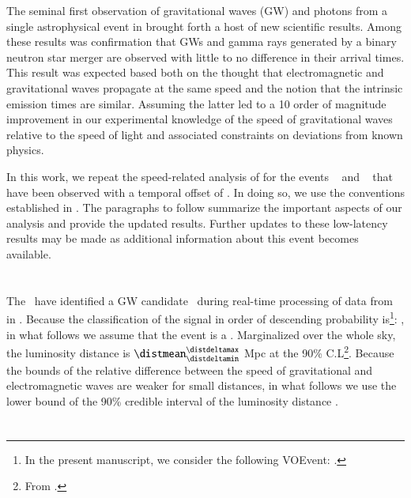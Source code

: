 \documentclass[aps,twocolumn,nofootinbib,nopreprintnumbers,showpacs,linenumbers,floatfix,longbibliography,superscriptaddress,prd]{revtex4-1}
\begin{document}
The seminal first observation of gravitational waves (GW) and photons from a single astrophysical event in \cite{abbott:2017bnsgrb} brought forth a host of new scientific results. Among these results was confirmation that GWs and gamma rays generated by a binary neutron star merger
are observed with little to no difference in their arrival times.
This result was expected based both on
the thought that electromagnetic and gravitational waves propagate at the same speed
and the notion that the intrinsic emission times are similar.
Assuming the latter led to a 10 order of magnitude improvement in our experimental knowledge 
of the speed of gravitational waves relative to the speed of light
and associated constraints on deviations from known physics. \cite{abbott:2017bnsgrb}

In this work,
we repeat the speed-related analysis of \citet{abbott:2017bnsgrb} for the events 
\GWevent~ and \GRBevent~ that have been observed with a temporal offset of \tdelay.
In doing so,
we use the conventions established in \cite{abbott:2017bnsgrb}.
The paragraphs to follow
summarize the important aspects of our analysis
and provide the updated results.
Further updates to these low-latency results may be made
as additional information about this event becomes available.

\section{\GWevent}


The \GWcolla~have identified a GW candidate \GWevent~during real-time processing of data from \pipesup~ in \detectors. Because the classification of the signal in order of descending probability is\footnote{In the present manuscript, we consider the following VOEvent: \href{\urlVOEvent}{\urlVOEvent}.}: \Pevents, in what follows we assume that the event is a \ety. Marginalized over the whole sky, the luminosity distance is $\distmean^\distdeltamax_\distdeltamin$ Mpc at the 90\% C.L\footnote{From \href{\GWskyurl}{\GWskyurl}.}. Because the bounds of the relative difference between the speed of gravitational and electromagnetic waves are weaker for small distances, in what follows we use the lower bound of the 90\% credible interval of the luminosity distance \distance. 


\section{\GRBeventTitle}
\end{document}
